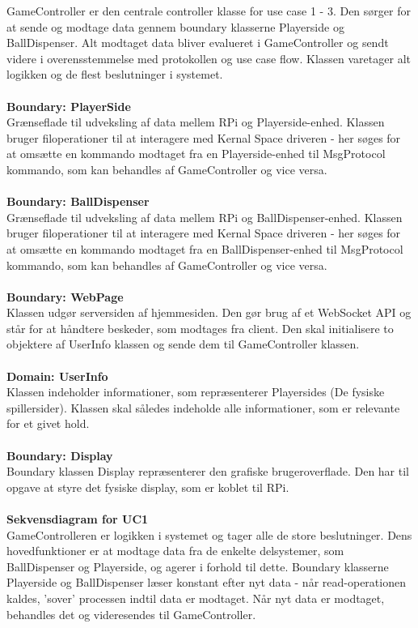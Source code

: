 \documentclass[Rapport/Rapport_main.tex]{subfiles}
\begin{document}
GameController er den centrale controller klasse for use case 1 - 3. Den sørger for at sende og modtage data gennem boundary klasserne Playerside og BallDispenser. Alt modtaget data bliver evalueret i GameController og sendt videre i overensstemmelse med protokollen og use case flow. Klassen varetager alt logikken og de flest beslutninger i systemet.\\\\
\textbf{Boundary:  PlayerSide}\\
Grænseflade til udveksling af data mellem RPi og Playerside-enhed. Klassen bruger filoperationer til at interagere med Kernal Space driveren - her søges for at omsætte en kommando modtaget fra en Playerside-enhed til MsgProtocol kommando, som kan behandles af GameController og vice versa.\\\\
\textbf{Boundary:  BallDispenser}\\
Grænseflade til udveksling af data mellem RPi og BallDispenser-enhed. Klassen bruger filoperationer til at interagere med Kernal Space driveren - her søges for at omsætte en kommando modtaget fra en BallDispenser-enhed til MsgProtocol kommando, som kan behandles af GameController og vice versa.\\\\
\textbf{Boundary: WebPage}\\
Klassen udgør serversiden af hjemmesiden. Den gør brug af et WebSocket API og står for at håndtere beskeder, som modtages fra client. Den skal initialisere to objektere af UserInfo klassen og sende dem til GameController klassen.\\\\
\textbf{Domain: UserInfo}\\
Klassen indeholder informationer, som repræsenterer Playersides (De fysiske spillersider). Klassen skal således indeholde alle informationer, som er relevante for et givet hold.\\\\
\textbf{Boundary: Display}\\
Boundary klassen Display repræsenterer den grafiske brugeroverflade. Den har til opgave at styre det fysiske display, som er koblet til RPi. \\\\
\textbf{Sekvensdiagram for UC1}\\
GameControlleren er logikken i systemet og tager alle de store beslutninger. Dens hovedfunktioner er at modtage data fra de enkelte delsystemer, som BallDispenser og Playerside, og agerer i forhold til dette. Boundary klasserne Playerside og BallDispenser læser konstant efter nyt data - når read-operationen kaldes, 'sover' processen indtil data er modtaget. Når nyt data er modtaget, behandles det og videresendes til GameController. \\\\
\end{document}
